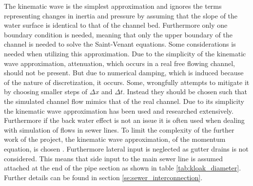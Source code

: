 The kinematic wave is the simplest approximation and ignores the terms representing changes in inertia and pressure by assuming that the slope of the water surface is identical to that of the channel bed. Furthermore only one boundary condition is needed, meaning that only the upper boundary of the channel is needed to solve the Saint-Venant equations.  
Some considerations is needed when utilizing this approximation.      
Due to the simplicity of the kinematic wave approximation, attenuation, which occurs in a real free flowing channel, should not be present. But due to numerical damping, which is induced because of the nature of discretization, it occurs. Some, wrongfully attempts to mitigate it by choosing smaller steps of $\Delta x$ and $\Delta t$. Instead they should be chosen such that the simulated channel flow mimics that of the real channel.
Due to its simplicity the kinematic wave approximation has been used and researched extensively. Furthermore if the back water effect is not an issue it is often used when dealing with simulation of flows in sewer lines.
To limit the complexity of the further work of the project, the kinematic wave approximation, of the momentum equation, is chosen \cite{stormwatercollectionsystems}.
Furthermore lateral input is neglected as gutter drains is not considered. 
This means that side input to the main sewer line is assumed attached at the end of the pipe section as shown in table \ref{tab:kloak_diameter}. Further details can be found in section \ref{se:sewer_interconnection}. 






